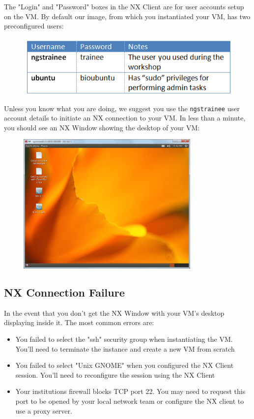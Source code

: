 The "Login" and "Password" boxes in the NX Client are for user accounts setup on
the VM. By default our image, from which you instantiated your VM, has two
preconfigured users:
\begin{figure}[H]
  \centering
  \includegraphics[scale=0.5]{nx_client/usernames_passwords.png}
  \caption{\label{fig:nx_usernames_passwords}}
\end{figure}

Unless you know what you are doing, we suggest you use the \texttt{ngstrainee}
user account details to initiate an NX connection to your VM. In less than a
minute, you should see an NX Window showing the desktop of your VM:
\begin{figure}[H]
  \centering
  \includegraphics[width=0.8\textwidth]{nx_client/connected.png}
  \caption{\label{fig:nx_connected}}
\end{figure}

\subsection{NX Connection Failure}
In the event that you don't get the NX Window with your VM's desktop displaying
inside it. The most common errors are:
\begin{itemize}
\item You failed to select the "ssh" security group when instantiating the VM.
You'll need to terminate the instance and create a new VM from scratch
\item You failed to select "Unix GNOME" when you configured the NX Client
session. You'll need to reconfigure the session using the NX Client
\item Your institutions firewall blocks TCP port 22. You may need to request this
port to be opened by your local network team or configure the NX client to use a
proxy server.
\end{itemize}

